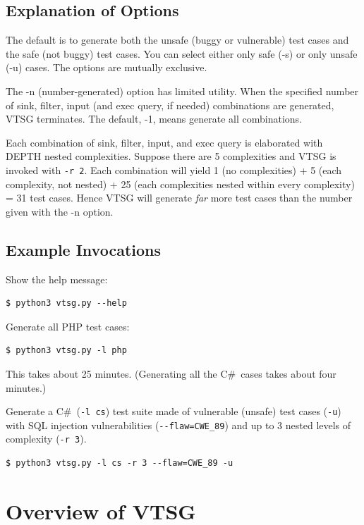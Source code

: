 \documentclass[12pt]{article}
\newcommand{\CSharp}{C{\fontseries{b}\selectfont\#}}
\begin{document}
\subsection{Explanation of Options}

The default is to generate both the unsafe (buggy or vulnerable)
test cases and the safe (not buggy) test cases.  You can select
either only safe (-s) or only unsafe (-u) cases.  The options are
mutually exclusive.

The -n (number-generated) option has limited utility.  When the
specified number of sink, filter, input (and exec query, if needed)
combinations are generated, VTSG terminates.  The default, -1,
means generate all combinations.

Each combination of sink, filter, input, and exec query is elaborated
with DEPTH nested complexities.  Suppose there are 5 complexities
and VTSG is invoked with \verb|-r 2|.  Each combination will yield
1 (no complexities) + 5 (each complexity, not nested) + 
25 (each complexities nested within every complexity) = 31 test cases.  
Hence VTSG will generate \emph{far} more test cases than the number
given with the -n option.

\subsection{Example Invocations}

Show the help message:
\begin{verbatim}
$ python3 vtsg.py --help
\end{verbatim}

Generate all PHP test cases:
\begin{verbatim}
$ python3 vtsg.py -l php
\end{verbatim}

This takes about 25 minutes.  (Generating all the \CSharp\ cases takes about four
minutes.)

Generate a \CSharp\ (\verb|-l cs|) test suite made of vulnerable (unsafe) test
cases (\verb|-u|) with SQL injection vulnerabilities (\verb|--flaw=CWE_89|)
and up to 3 nested levels of complexity (\verb|-r 3|).
\begin{verbatim}
$ python3 vtsg.py -l cs -r 3 --flaw=CWE_89 -u
\end{verbatim}
 
\section{Overview of VTSG}
\end{document}
